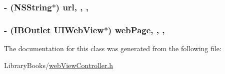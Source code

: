 \subsubsection[{url}]{\setlength{\rightskip}{0pt plus 5cm}-\/ (N\+S\+String$\ast$) url\hspace{0.3cm}{\ttfamily [read]}, {\ttfamily [write]}, {\ttfamily [atomic]}, {\ttfamily [strong]}}\label{interfaceweb_view_controller_a6b63e34b44fea86498e7c602ee3700a9}
\hypertarget{interfaceweb_view_controller_a0a973d91b25a215ef7df7b9e5e6ad860}{}
\subsubsection[{web\+Page}]{\setlength{\rightskip}{0pt plus 5cm}-\/ (I\+B\+Outlet U\+I\+Web\+View$\ast$) web\+Page\hspace{0.3cm}{\ttfamily [read]}, {\ttfamily [write]}, {\ttfamily [nonatomic]}, {\ttfamily [weak]}}\label{interfaceweb_view_controller_a0a973d91b25a215ef7df7b9e5e6ad860}


The documentation for this class was generated from the following file\+:\begin{DoxyCompactItemize}
\item 
Library\+Books/\hyperlink{web_view_controller_8h}{web\+View\+Controller.\+h}\end{DoxyCompactItemize}
